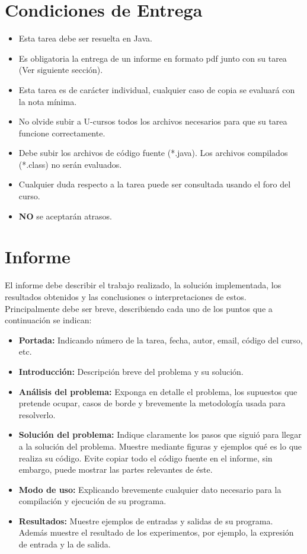 \documentclass[dcc]{fcfmcourse}
\begin{document}
\section{Condiciones de Entrega}

\begin{itemize}
    \item Esta tarea debe ser resuelta en Java.
    \item Es obligatoria la entrega de un informe en formato pdf junto con su tarea (Ver siguiente sección).
    \item Esta tarea es de carácter individual, cualquier caso de copia se evaluará con la nota mínima.
    \item No olvide subir a U-cursos todos los archivos necesarios para que su tarea funcione correctamente.
    \item Debe subir los archivos de código fuente (*.java). Los archivos compilados (*.class) no serán evaluados.
    \item Cualquier duda respecto a la tarea puede ser consultada usando el foro del curso.
    \item \textbf{NO} se aceptarán atrasos.
\end{itemize}


\section{Informe}

El informe debe describir el trabajo realizado, la solución implementada, los resultados obtenidos
y las conclusiones o interpretaciones de estos. Principalmente debe ser breve, describiendo cada uno
de los puntos que a continuación se indican:

\begin{itemize}
    \item \textbf{Portada:} Indicando número de la tarea, fecha, autor, email, código del curso, etc.
    \item \textbf{Introducción:} Descripción breve del problema y su solución.
    \item \textbf{Análisis del problema:} Exponga en detalle el problema, los supuestos que pretende ocupar, casos de borde y brevemente la metodología usada para resolverlo.
    \item \textbf{Solución del problema:} Indique claramente los pasos que siguió para llegar a la solución
    del problema. Muestre mediante figuras y ejemplos qué es lo que realiza su código. Evite
    copiar todo el código fuente en el informe, sin embargo, puede mostrar las partes relevantes
    de éste.
    \item \textbf{Modo de uso:} Explicando brevemente cualquier dato necesario para la compilación y
    ejecución de su programa.
    \item \textbf{Resultados:} Muestre ejemplos de entradas y salidas de su programa. Además muestre el resultado de los experimentos, por ejemplo, la expresión de entrada y la de salida.


\end{itemize}
\end{document}
